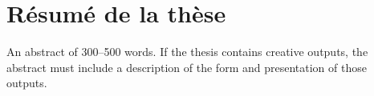 \chapter*{R\'esum\'e de la th\`ese}

An abstract of 300–500 words. If the thesis contains creative outputs, the abstract must include a description of the form and presentation of those outputs.
